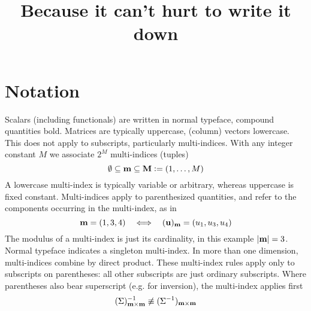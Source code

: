 \documentclass[a4paper, margin=1in, reqno]{RAMArticle}
\title{Because it can't hurt to write it down}
\author{}
\begin{document}
\maketitle


\section{Notation}
	Scalars (including functionals) are written in normal typeface, compound quantities bold. Matrices are typically uppercase, (column) vectors lowercase. 
	This does not apply to subscripts, particularly multi-indices. With any integer constant \(M\) we associate \(2^{M}\) multi-indices (tuples)
	\begin{equation*}
		\emptyset\subseteq\mathbf{m}\subseteq\mathbf{M}\mathrel{\mathop:}=(1,\ldots,M)
	\end{equation*}
	A lowercase multi-index is typically variable or arbitrary, whereas uppercase is fixed constant. 
	Multi-indices apply to parenthesized quantities, and refer to the components occurring in the multi-index, as in
	\begin{equation*}
		\mathbf{m} = (1,3,4) \quad \Longleftrightarrow \quad (\mathbf{u})_{\mathbf{m}} = (u_{1},u_{3},u_{4})
	\end{equation*}
	The modulus of a multi-index is just its cardinality, in this example \(\left\lvert\mathbf{m}\right\rvert=3\). Normal typeface indicates a singleton multi-index.
	In more than one dimension, multi-indices combine by direct product.
	These multi-index rules apply only to subscripts on parentheses: all other subscripts are just ordinary subscripts. 
	Where parentheses also bear superscript (e.g. for inversion), the multi-index applies first
	\begin{equation*}
		(\Sigma)_{\mathbf{m}\times\mathbf{m}}^{-1} \not\equiv (\Sigma^{-1})_{\mathbf{m}\times\mathbf{m}}
	\end{equation*}
\end{document}
